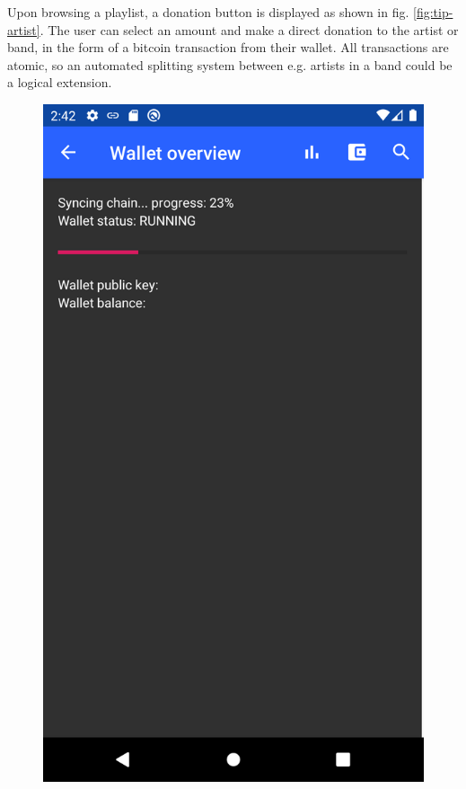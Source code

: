 Upon browsing a playlist, a donation button is displayed as shown in fig. \ref{fig:tip-artist}. The user can select an amount and make a direct donation to the artist or band, in the form of a bitcoin transaction from their wallet. All transactions are atomic, so an automated splitting system between e.g. artists in a band could be a logical extension.
\begin{figure}
        \includegraphics[width=1\linewidth]{implementation/wallet-sync.png}

\end{figure}
